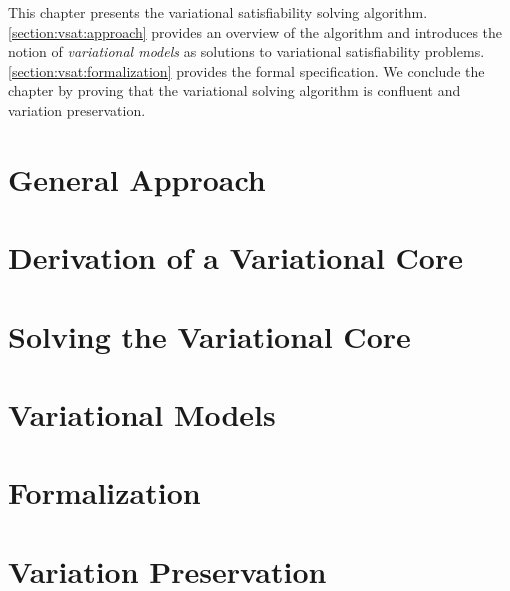 \label{chapter:vsat}

This chapter presents the variational satisfiability solving algorithm.
\autoref{section:vsat:approach} provides an overview of the algorithm and
introduces the notion of \emph{variational models} as solutions to variational
satisfiability problems. \autoref{section:vsat:formalization} provides the
formal specification. We conclude the chapter by proving that the variational solving
algorithm is confluent and variation preservation.

\section{General Approach}


\section{Derivation of a Variational Core}


\section{Solving the Variational Core}


\section{Variational Models}


\section{Formalization}


\section{Variation Preservation}



